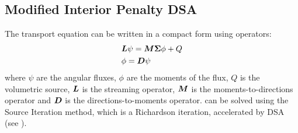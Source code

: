 \subsection{Modified Interior Penalty DSA}
The transport equation can be written in a compact form using operators:
\begin{align}
  &\bs{L} \psi = \bs{M}\bs{\Sigma} \phi + Q \label{transport}\\
  &\phi = \bs{D}\psi \label{phi_D_psi}
\end{align}
where $\psi$ are the angular fluxes, $\phi$ are the moments of the flux, $Q$
is the volumetric source, $\boldsymbol{L}$ is the streaming operator, $\boldsymbol{M}$ is the
moments-to-directions operator and $\boldsymbol{D}$ is the directions-to-moments
operator.  can be solved using the Source Iteration 
method, which is a Richardson iteration, accelerated by DSA (see 
).

